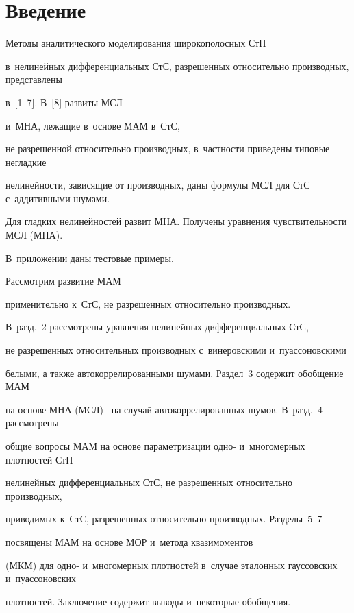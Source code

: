       




\section{Введение}



Методы  аналитического моделирования широкополосных СтП 

в~нелинейных дифференциальных СтС, разрешенных относительно производных, пред\-став\-ле\-ны

 в~[1--7]. В~[8] развиты МСЛ 

 и~МНА, лежащие в~основе МАМ в~СтС, 

 не разрешенной относительно производных, в~част\-ности приведены типовые негладкие 

 нелинейности, зависящие от производных, даны формулы МСЛ для СтС с~аддитивными шумами. 

 Для гладких нелинейностей развит МНА. Получены уравнения чувствительности МСЛ (МНА). 

 В~приложении даны тестовые при\-меры.



Рассмотрим развитие МАМ~\cite{1-s2, 2-s2, 5-s2} 

применительно к~СтС, не разрешенных относительно производных.

В~разд.~2 рассмотрены уравнения нелинейных дифференциальных СтС, 

не разрешенных относительных производных с~винеровскими и~пуассоновскими 

белыми, а также  автокоррелированными шумами. Раздел~3 содержит обобщение МАМ  

на основе МНА (МСЛ)~\cite{8-s2} на случай автокоррелированных шумов. В~разд.~4 рассмотрены  

общие вопросы МАМ на основе параметризации одно- и~многомерных плотностей СтП 

нелинейных дифференциальных  СтС, не разрешенных относительно производных, 

приводимых к~СтС, разрешенных относительно производных. Разделы~5--7 

посвящены МАМ на основе МОР и~метода квазимоментов 

(МКМ) для одно- и~многомерных плотностей в~случае эталонных гауссовских и~пуассоновских 

плотностей. Заключение содержит выводы и~некоторые обобщения. 

